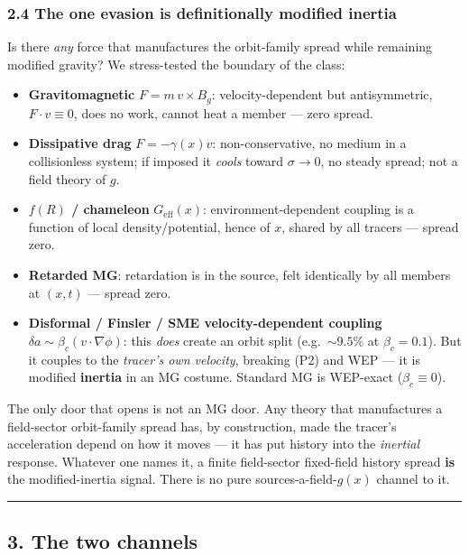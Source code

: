 \documentclass[
]{article}
\providecommand{\tightlist}{%
  \setlength{\itemsep}{0pt}\setlength{\parskip}{0pt}}
\begin{document}
\subsubsection{2.4 The one evasion is definitionally modified
inertia}\label{the-one-evasion-is-definitionally-modified-inertia}

Is there \emph{any} force that manufactures the orbit-family spread
while remaining modified gravity? We stress-tested the boundary of the
class:

\begin{itemize}
\tightlist
\item
  \textbf{Gravitomagnetic} \(F=m\,v\times B_g\): velocity-dependent but
  antisymmetric, \(F\cdot v\equiv0\), does no work, cannot heat a member
  --- zero spread.
\item
  \textbf{Dissipative drag} \(F=-\gamma(x)v\): non-conservative, no
  medium in a collisionless system; if imposed it \emph{cools} toward
  \(\sigma\to0\), no steady spread; not a field theory of \(g\).
\item
  \textbf{\(f(R)\) / chameleon} \(G_\mathrm{eff}(x)\):
  environment-dependent coupling is a function of local
  density/potential, hence of \(x\), shared by all tracers --- spread
  zero.
\item
  \textbf{Retarded MG}: retardation is in the source, felt identically
  by all members at \((x,t)\) --- spread zero.
\item
  \textbf{Disformal / Finsler / SME velocity-dependent coupling}
  \(\delta a\sim\beta_c(v\cdot\nabla\phi)\): this \emph{does} create an
  orbit split (e.g.~\(\sim9.5\%\) at \(\beta_c=0.1\)). But it couples to
  the \emph{tracer's own velocity}, breaking (P2) and WEP --- it is
  modified \textbf{inertia} in an MG costume. Standard MG is WEP-exact
  (\(\beta_c\equiv0\)).
\end{itemize}

The only door that opens is not an MG door. Any theory that manufactures
a field-sector orbit-family spread has, by construction, made the
tracer's acceleration depend on how it moves --- it has put history into
the \emph{inertial} response. Whatever one names it, a finite
field-sector fixed-field history spread \textbf{is} the modified-inertia
signal. There is no pure sources-a-field-\(g(x)\) channel to it.

\begin{center}\rule{0.5\linewidth}{0.5pt}\end{center}

\subsection{3. The two channels}\label{the-two-channels}
\end{document}
